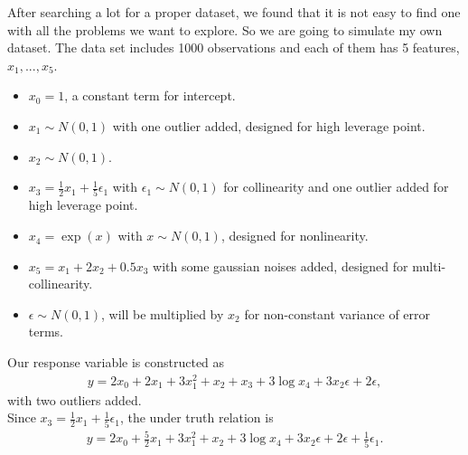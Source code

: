 \documentclass{article}
\begin{document}
After searching a lot for a proper dataset, we found that it is not easy to find one with all the problems we want to explore. So we are going to simulate my own dataset. The data set includes 1000 observations and each of them has 5 features, $x_1, ..., x_5$. 
\begin{itemize}
\item  $x_0 = 1$, a constant term for intercept. 
\item  $x_1 \sim N(0, 1)$ with one outlier added, designed for high leverage point.
\item  $x_2 \sim N(0, 1)$.
\item  $x_3 = \frac 1 2 x_1 +\frac 1 5 \epsilon_1$ with $\epsilon_1 \sim N(0, 1)$ for collinearity and one outlier added for high leverage point.
\item  $x_4 = \exp(x)$ with $x \sim N(0, 1)$, designed for nonlinearity.
\item  $x_5 = x_1 + 2x_2 + 0.5x_3$ with some gaussian noises added, designed for multi-collinearity. 
\item  $\epsilon \sim N(0, 1)$, will be multiplied by $x_2$ for non-constant variance of error terms.
\end{itemize} 
Our response variable is constructed as 
\begin{align}\label{eq1}
y = 2 x_0 + 2 x_1 + 3 x_1^2 + x_2 + x_3 + 3\log{x_4} + 3 x_2 \epsilon +  2 \epsilon,
\end{align}
with two outliers added.\\

Since $x_3 = \frac 1 2 x_1 +\frac 1 5 \epsilon_1$, the under truth relation is 
\begin{align}\label{eq2}
y = 2 x_0 + \frac 5 2 x_1 + 3 x_1^2 + x_2 + 3\log{x_4} + 3 x_2 \epsilon +  2 \epsilon + \frac 1 5 \epsilon_1.
\end{align}
\end{document}
